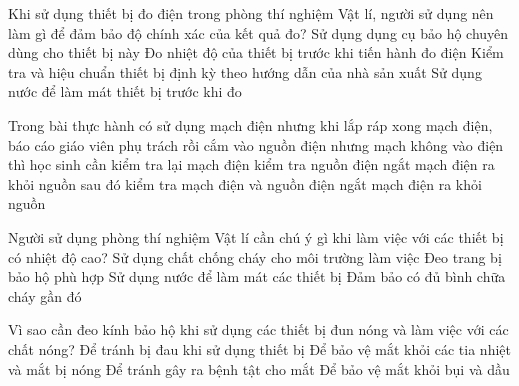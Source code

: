 \begin{ex}
Khi sử dụng thiết bị đo điện trong phòng thí nghiệm Vật lí, người sử dụng nên làm gì để đảm bảo độ chính xác của kết quả đo?
\choice
{Sử dụng dụng cụ bảo hộ chuyên dùng cho thiết bị này}
{Đo nhiệt độ của thiết bị trước khi tiến hành đo điện}
{\True Kiểm tra và hiệu chuẩn thiết bị định kỳ theo hướng dẫn của nhà sản xuất}
{Sử dụng nước để làm mát thiết bị trước khi đo}
\end{ex}

\begin{ex}
Trong bài thực hành có sử dụng mạch điện nhưng khi lắp ráp xong mạch điện, báo cáo giáo viên phụ trách rồi cắm vào nguồn điện nhưng mạch không vào điện thì học sinh cần
\choice
{kiểm tra lại mạch điện}
{kiểm tra nguồn điện}
{\True ngắt mạch điện ra khỏi nguồn sau đó kiểm tra mạch điện và nguồn điện}
{ngắt mạch điện ra khỏi nguồn}
\end{ex}

\begin{ex}
Người sử dụng phòng thí nghiệm Vật lí cần chú ý gì khi làm việc với các thiết bị có nhiệt độ cao?
\choice
{Sử dụng chất chống cháy cho môi trường làm việc}
{\True Đeo trang bị bảo hộ phù hợp}
{Sử dụng nước để làm mát các thiết bị}
{Đảm bảo có đủ bình chữa cháy gần đó}
\end{ex}

\begin{ex}
Vì sao cần đeo kính bảo hộ khi sử dụng các thiết bị đun nóng và làm việc với các chất nóng?
\choice
{Để tránh bị đau khi sử dụng thiết bị}
{\True Để bảo vệ mắt khỏi các tia nhiệt và mắt bị nóng}
{Để tránh gây ra bệnh tật cho mắt}
{Để bảo vệ mắt khỏi bụi và dầu}
\end{ex}

